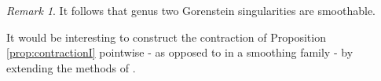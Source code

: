 \documentclass{compositio}
\newcommand{\PP}{\mathbb P}
\renewcommand{\k}{\mathbf k}
\newcommand{\OO}{\mathcal O}
\renewcommand{\to}{\rightarrow}
\newcommand{\dvr}{\Delta}
\theoremstyle{plain}
\theoremstyle{definition}
\theoremstyle{remark}
\newtheorem{rem}[thm]{Remark}
\newtheorem*{caveat}{Caveat}
\begin{document}
\begin{rem}\label{rem:smoothable_sing}
 It follows that genus two Gorenstein singularities are smoothable.
\end{rem}

It would be interesting to construct the contraction of Proposition \ref{prop:contractionI} pointwise - as opposed to in a smoothing family - by extending the methods of \cite{Bozlee}.

\end{document}
